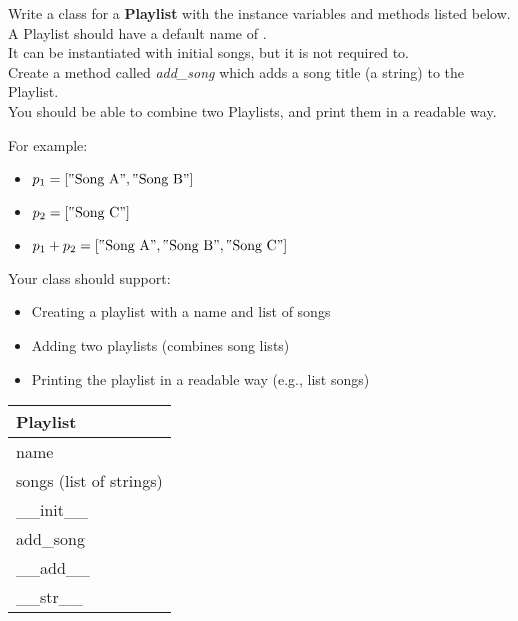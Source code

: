 




	\item %
		Write a class for a \textbf{Playlist} with the instance variables and methods listed 
		below.\\
		A Playlist should have a default name of .\\
		It can be instantiated with initial songs, but it is not required to.\\
		Create a method called \textit{add\_song} which adds a song title (a string) to the 
		Playlist.\\
		You should be able to combine two Playlists, and print them in a readable way.
			
		\begin{minipage}[t]{0.65\textwidth}
			For example:
			\begin{itemize}
				\item $p_1 = [\csqt{Song A}, \csqt{Song B}]$
				\item $p_2 = [\csqt{Song C}]$
				\item $p_1 + p_2 = [\csqt{Song A}, \csqt{Song B}, \csqt{Song C}]$
			\end{itemize}

			Your class should support:
			\begin{itemize}
				\item Creating a playlist with a name and list of songs
				\item Adding two playlists (combines song lists)
				\item Printing the playlist in a readable way (e.g., list songs)
			\end{itemize}	
		\end{minipage}
		\hfill
		\begin{minipage}[t]{0.32\textwidth}
			\vspace{.2em}
			\begin{flushright}
				\begin{tabular}{|l|}
					\hline
					Playlist \\ \hline
					name \\
					songs (list of strings) \\ \hline
					\_\_init\_\_ \\
					add\_song \\
					\_\_add\_\_ \\
					\_\_str\_\_ \\ \hline
				\end{tabular}
			\end{flushright}
		\end{minipage}
		

